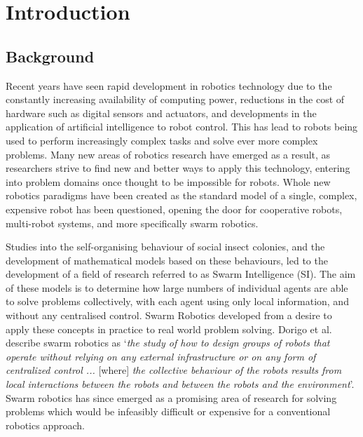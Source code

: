 
\chapter[Introduction]{Introduction} %

\label{Chapter1} %


\newcommand{\keyword}[1]{\textbf{#1}}
\newcommand{\tabhead}[1]{\textbf{#1}}
\newcommand{\code}[1]{\texttt{#1}}
\newcommand{\file}[1]{\texttt{\bfseries#1}}
\newcommand{\option}[1]{\texttt{\itshape#1}}


\section{Background}
Recent years have seen rapid development in robotics technology due to the constantly increasing availability of computing power, reductions in the cost of hardware such as digital sensors and actuators, and developments in the application of artificial intelligence to robot control. This has lead to robots being used to perform increasingly complex tasks and solve ever more complex problems. Many new areas of robotics research have emerged as a result, as researchers strive to find new and better ways to apply this technology, entering into problem domains once thought to be impossible for robots. Whole new robotics paradigms have been created as the standard model of a single, complex, expensive robot has been questioned, opening the door for cooperative robots, multi-robot systems, and more specifically swarm robotics.

Studies into the self-organising behaviour of social insect colonies, and the development of mathematical models based on these behaviours, led to the development of a field of research referred to as Swarm Intelligence (SI). The aim of these models is to determine how large numbers of individual agents are able to solve problems collectively, with each agent using only local information, and without any centralised control. Swarm Robotics developed from a desire to apply these concepts in practice to real world problem solving. Dorigo et al. describe swarm robotics as `\textit{the study of how to design groups of robots that operate without relying on any external infrastructure or on any form of centralized control ... }[where]\textit{ the collective behaviour of the robots results from local interactions between the robots and between the robots and the environment}\cite{Dorigo:2014}'. Swarm robotics has since emerged as a promising area of research for solving problems which would be infeasibly difficult or expensive for a conventional robotics approach.

